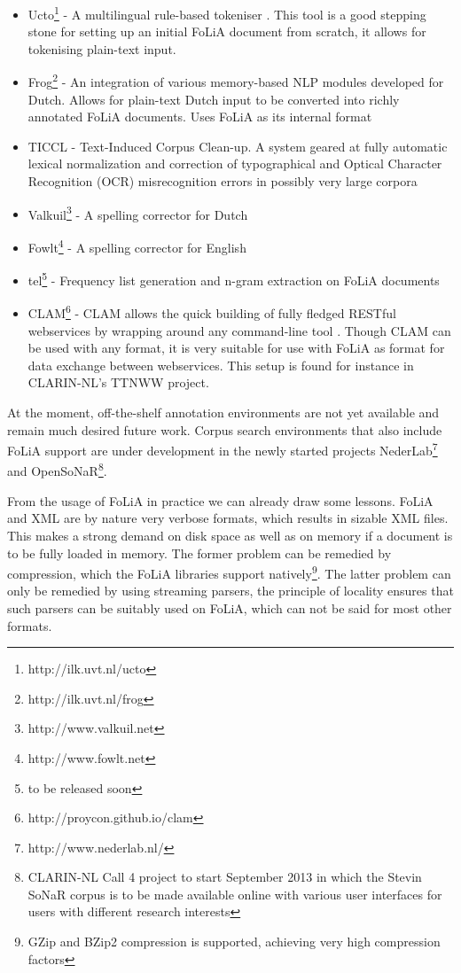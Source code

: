 \documentclass[a4paper,10pt,twoside]{article}
\begin{document}
\begin{itemize}
  \item Ucto\footnote{http://ilk.uvt.nl/ucto} - A multilingual rule-based
    tokeniser \cite{UCTO}. This tool is a good stepping stone for setting up an initial
    FoLiA document from scratch, it allows for  tokenising plain-text input.
 \item Frog\footnote{http://ilk.uvt.nl/frog} - An integration of various memory-based NLP modules developed for Dutch. Allows for plain-text Dutch input to be converted into richly
  annotated FoLiA documents. Uses FoLiA as its internal format
 \item TICCL - Text-Induced Corpus Clean-up. A system geared at fully automatic lexical normalization and correction of typographical and Optical Character Recognition (OCR) misrecognition errors in possibly very large corpora \cite{Reynaert2010}
 \item Valkuil\footnote{http://www.valkuil.net} - A spelling corrector for Dutch
 \item Fowlt\footnote{http://www.fowlt.net} - A spelling corrector for English
 \item tel\footnote{to be released soon} - Frequency list generation and n-gram
   extraction on FoLiA documents
 \item CLAM\footnote{http://proycon.github.io/clam} - CLAM allows the quick
   building of fully fledged RESTful webservices by wrapping around any
   command-line tool \cite{CLAM}. Though CLAM can be used with any format, it
   is very suitable
   for use with FoLiA as format for data exchange between webservices. This
   setup is found for instance in CLARIN-NL's TTNWW project. %
\end{itemize}

At the moment, off-the-shelf annotation environments are not yet available and
remain much desired future work. Corpus search environments that also include
FoLiA support are under development in the newly started projects
NederLab\footnote{http://www.nederlab.nl/} and OpenSoNaR\footnote{CLARIN-NL
Call 4 project to start September 2013 in which the Stevin SoNaR corpus is to
be made available online with various user interfaces for users with different
research interests}. %

From the usage of FoLiA in practice we can already draw some lessons. FoLiA and
XML are by nature very verbose formats, which results in sizable XML files.
This makes a strong demand on disk space as well as on memory if a document is
to be fully loaded in memory. The former problem can be remedied by
compression, which the FoLiA libraries support natively\footnote{GZip and BZip2
compression is supported, achieving very high compression factors}. The latter
problem can only be remedied by using streaming parsers, the principle of
locality ensures that such parsers can be suitably used on FoLiA, which can not
be said for most other formats.
\end{document}

